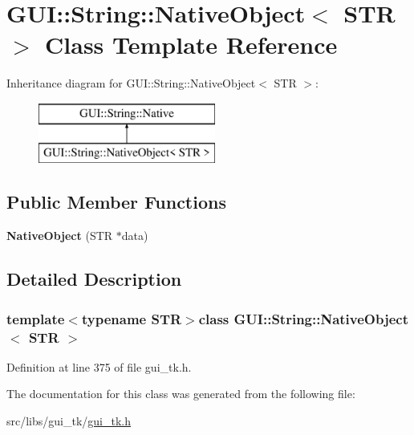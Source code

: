 \hypertarget{classGUI_1_1String_1_1NativeObject}{\section{G\-U\-I\-:\-:String\-:\-:Native\-Object$<$ S\-T\-R $>$ Class Template Reference}
\label{classGUI_1_1String_1_1NativeObject}
}
Inheritance diagram for G\-U\-I\-:\-:String\-:\-:Native\-Object$<$ S\-T\-R $>$\-:\begin{figure}[H]
\begin{center}
\leavevmode
\includegraphics[height=2.000000cm]{classGUI_1_1String_1_1NativeObject}
\end{center}
\end{figure}
\subsection*{Public Member Functions}
\begin{DoxyCompactItemize}
\item 
\hypertarget{classGUI_1_1String_1_1NativeObject_ae2603760ef4c500fc55113eb75faae22}{{\bfseries Native\-Object} (S\-T\-R $\ast$data)}\label{classGUI_1_1String_1_1NativeObject_ae2603760ef4c500fc55113eb75faae22}

\end{DoxyCompactItemize}


\subsection{Detailed Description}
\subsubsection*{template$<$typename S\-T\-R$>$class G\-U\-I\-::\-String\-::\-Native\-Object$<$ S\-T\-R $>$}



Definition at line 375 of file gui\-\_\-tk.\-h.



The documentation for this class was generated from the following file\-:\begin{DoxyCompactItemize}
\item 
src/libs/gui\-\_\-tk/\hyperlink{gui__tk_8h}{gui\-\_\-tk.\-h}\end{DoxyCompactItemize}
